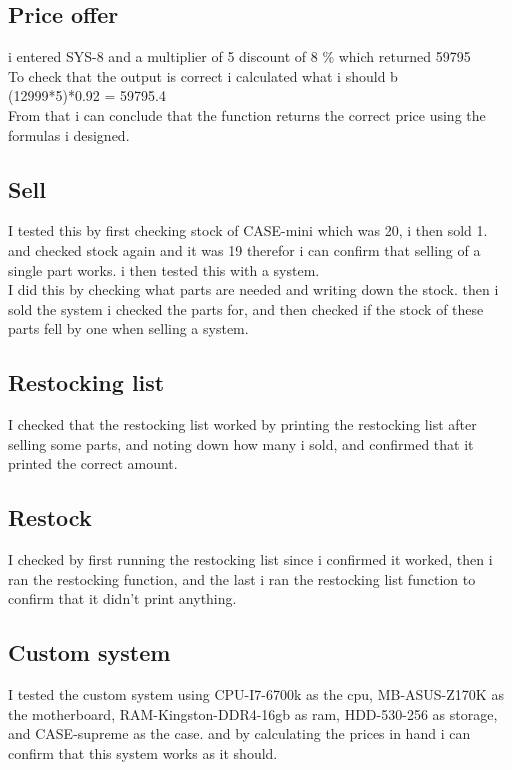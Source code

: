 \documentclass[a4paper,10pt,titlepage]{report}
\begin{document}
\subsection{Price offer}
i entered SYS-8 and a multiplier of 5 discount of 8 \% which returned 59795 \\
To check that the output is correct i calculated what i should b \\
(12999*5)*0.92 = 59795.4 \\
From that i can conclude that the function returns the correct price using the formulas i designed. \\
\vspace{5 mm}
\subsection{Sell}
I tested this by first checking stock of CASE-mini which was 20, i then sold 1. and checked stock again and it was 19 therefor i can confirm that selling of a single part works. i then tested this with a system. \\
I did this by checking what parts are needed and writing down the stock. then i sold the system i checked the parts for, and then checked if the stock of these parts fell by one when selling a system.
\\
\vspace{5 mm}
\subsection{Restocking list}
I checked that the restocking list worked by printing the restocking list after selling some parts, and noting down how many i sold, and confirmed that it printed the correct amount.
\\
\vspace{5 mm}
\subsection{Restock}
I checked by first running the restocking list since i confirmed it worked, then i ran the restocking function, and the last i ran the restocking list function to confirm that it didn't print anything.
\\
\vspace{5 mm}
\subsection{Custom system}
I tested the custom system using CPU-I7-6700k as the cpu, MB-ASUS-Z170K as the motherboard, RAM-Kingston-DDR4-16gb as ram, HDD-530-256 as storage, and CASE-supreme as the case. 
and by calculating the prices in hand i can confirm that this system works as it should.
\end{document}
